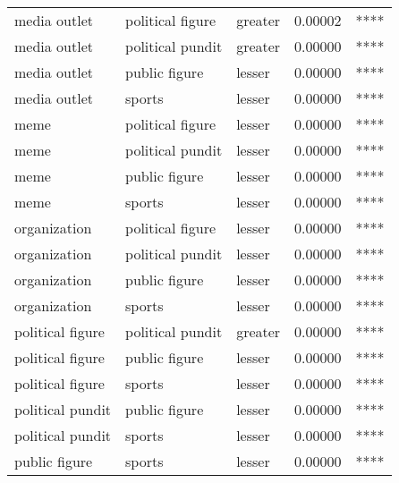 \begin{table}
\begin{tabular}[t]{lllll}
media outlet & political figure & greater & 0.00002 & ****\\
media outlet & political pundit & greater & 0.00000 & ****\\
media outlet & public figure & lesser & 0.00000 & ****\\
media outlet & sports & lesser & 0.00000 & ****\\
meme & political figure & lesser & 0.00000 & ****\\
meme & political pundit & lesser & 0.00000 & ****\\
meme & public figure & lesser & 0.00000 & ****\\
meme & sports & lesser & 0.00000 & ****\\
organization & political figure & lesser & 0.00000 & ****\\
organization & political pundit & lesser & 0.00000 & ****\\
organization & public figure & lesser & 0.00000 & ****\\
organization & sports & lesser & 0.00000 & ****\\
political figure & political pundit & greater & 0.00000 & ****\\
political figure & public figure & lesser & 0.00000 & ****\\
political figure & sports & lesser & 0.00000 & ****\\
political pundit & public figure & lesser & 0.00000 & ****\\
political pundit & sports & lesser & 0.00000 & ****\\
public figure & sports & lesser & 0.00000 & ****\\
\bottomrule
\end{tabular}
\end{table}
